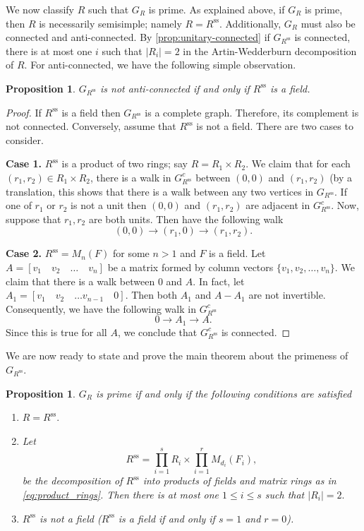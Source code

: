 \documentclass[12pt, a4paper]{amsart}
\newtheorem{prop}[thm]{Proposition}
\theoremstyle{definition}
\numberwithin{equation}{section}
\newcommand{\s}{\text{ss}}
\begin{document}
We now classify $R$ such that $G_{R}$ is prime. As explained above, if $G_{R}$ is prime, then $R$ is necessarily semisimple; namely $R=R^{\s}.$ Additionally, $G_{R}$ must also be connected and anti-connected. By \cref{prop:unitary-connected} if $G_{R^\s}$ is connected, there is at most one $i$ such that $|R_i|=2$ in the Artin-Wedderburn decomposition of $R.$ For anti-connected, we have the following simple observation. 

\begin{prop} \label{prop:unitary-anti-connected}
    $G_{R^{\s}}$ is not anti-connected if and only if $R^{\s}$ is a field.  
\end{prop}

\begin{proof}
    If $R^{\s}$ is a field then $G_{R^{\s}}$ is a complete graph. Therefore, its complement is not connected. Conversely, assume that $R^{\s}$ is not a field. There are two cases to consider. 

\textbf{Case 1.} $R^{\s}$ is a product of two rings; say $R=R_1 \times R_2.$ We claim that for each $(r_1, r_2) \in R_1 \times R_2$, there is a walk in $G_{R^{\s}}^c$ between $(0,0)$ and $(r_1, r_2)$ (by a translation, this shows that there is a walk between any two vertices in $G_{R^{\s}}$. If one of $r_1$ or $r_2$ is not a unit then $(0,0)$ and $(r_1, r_2)$ are adjacent in $G_{R^\s}^c.$ Now, suppose that $r_1, r_2$ are both units. Then have the following walk 
\[ (0,0) \to (r_1, 0) \to (r_1, r_2). \]

\textbf{Case 2.} $R^{\s} = M_n(F)$ for some $n>1$ and $F$ is a field. Let $A=[v_1 \quad v_2 \quad \ldots \quad v_n]$ be a matrix formed by column vectors $\{v_1, v_2, \ldots, v_n\}.$ We claim that there is a walk between $0$ and $A.$ In fact, let $A_1=[v_1 \quad v_2 \quad \ldots v_{n-1} \quad 0]$. Then both $A_1$ and $A-A_1$ are not invertible. Consequently, we have the following walk in $G_{R^{\s}}^c$ 
\[ 0 \to A_1 \to A. \] 
Since this is true for all $A$, we conclude that $G_{R^\s}^c$ is connected. 
\end{proof}
We are now ready to state and prove the main theorem about the primeness of $G_{R^{\s}}.$
\begin{prop} \label{prop:prime-unitary}
$G_R$ is  prime if and only if the following conditions are satisfied
\begin{enumerate}
    \item $R=R^{\s}.$
    \item Let 
    \[ R^{\s} = \prod_{i=1}^s R_i \times \prod_{i=1}^r M_{d_i}(F_i),\]
    be the decomposition of $R^{\s}$ into products of fields and matrix rings as in \cref{eq:product_rings}. 
    Then there is at most one $1 \leq i \leq s$ such that $|R_i|=2.$
    \item $R^{\s}$ is not a field ($R^{\s}$ is a field if and only if $s=1$ and $r=0$). 
\end{enumerate}
\end{prop}
\end{document}
